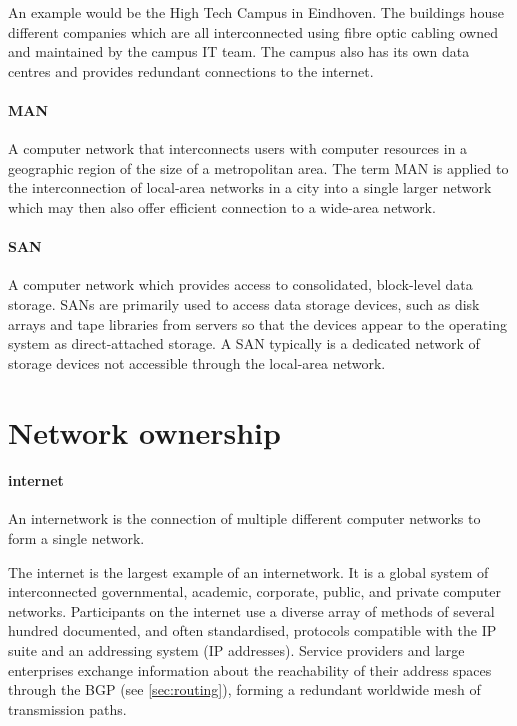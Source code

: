 {An example would be the High Tech Campus in Eindhoven.
The buildings house different companies which are all interconnected using fibre optic cabling owned and maintained by the campus \acs{IT} team.
The campus also has its own data centres and provides redundant connections to the internet.

\paragraph{\gls{MAN}}
A computer network that interconnects users with computer resources in a geographic region of the size of a metropolitan area.
The term \gls{MAN} is applied to the interconnection of local-area networks in a city into a single larger network which may then also offer efficient connection to a wide-area network.

\paragraph{\gls{SAN}}
A computer network which provides access to consolidated, block-level data storage.
\glspl{SAN} are primarily used to access data storage devices, such as disk arrays and tape libraries from servers so that the devices appear to the operating system as direct-attached storage.
A \gls{SAN} typically is a dedicated network of storage devices not accessible through the local-area network.


\section{Network ownership}
\label{sec:network-ownership}

\paragraph{internet}
An internetwork is the connection of multiple different computer networks to form a single network.

The internet is the largest example of an internetwork.
It is a global system of interconnected governmental, academic, corporate, public, and private computer networks.
Participants on the internet use a diverse array of methods of several hundred documented, and often standardised, protocols compatible with the \acl{IP} suite and an addressing system (\acs{IP} addresses).
Service providers and large enterprises exchange information about the reachability of their address spaces through the \gls{BGP} (see \vref{sec:routing}), forming a redundant worldwide mesh of transmission paths.

}
